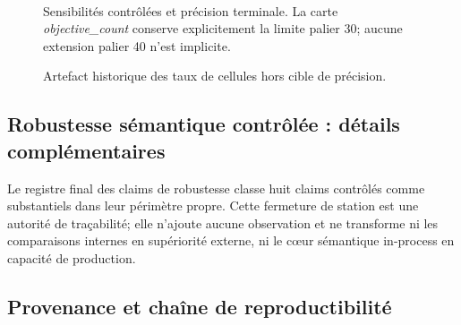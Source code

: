\begin{figure}[!t]
\centering
\begin{minipage}[t]{0.48\textwidth}\centering\end{minipage}\hfill
\begin{minipage}[t]{0.48\textwidth}\centering\end{minipage}\\[2mm]
\begin{minipage}[t]{0.48\textwidth}\centering\end{minipage}\hfill
\begin{minipage}[t]{0.48\textwidth}\centering\end{minipage}
\caption{Sensibilités contrôlées et précision terminale. La carte \emph{objective\_count} conserve explicitement la limite palier 30; aucune extension palier 40 n'est implicite.}
\label{fig:legacy-sensitivity-precision}
\end{figure}

\begin{figure}[!tb]
\centering

\caption{Artefact historique des taux de cellules hors cible de précision.}
\label{fig:legacy-sensitivity-failures}
\end{figure}

\begingroup
\renewcommand{\label}[1]{}

\endgroup

\subsection{Robustesse sémantique contrôlée : détails complémentaires}





Le registre final des claims de robustesse classe huit claims contrôlés comme substantiels dans leur périmètre propre. Cette fermeture de station est une autorité de traçabilité; elle n'ajoute aucune observation et ne transforme ni les comparaisons internes en supériorité externe, ni le cœur sémantique in-process en capacité de production.

\subsection{Provenance et chaîne de reproductibilité}


